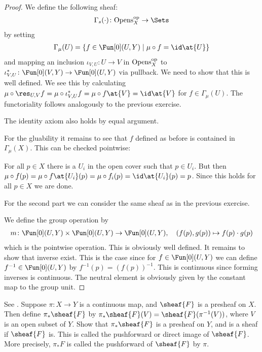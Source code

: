 \begin{proof}
  We define the following sheaf:
  \begin{align*}
    \Gamma_s(\cdot) \colon \Opens_X^\op \rightarrow \Sets
  \end{align*}
  by setting
  \begin{align*}
    \Gamma_\mu(U)= \{f\in \Fun[0](U,Y)\mid \mu\circ f = \id\at{U}\}
  \end{align*}
  and mapping an inclusion $\iota_{V,U} \colon U \rightarrow V$ in $\mathrm{Opens}_X^{\mathrm{op}}$ to
  $\iota^*_{V,U} \colon \Fun[0](V,Y) \rightarrow \Fun[0](U,Y)$ via
  pullback.
  We need to show that this is well defined. We see this by
  calculating $\mu \circ \res_{U,V}f = \mu \circ \iota_{V,U}^* f = \mu \circ f \at{V} = \id
  \at{V}$ for $f\in \Gamma_\mu (U)$.
  The functoriality follows analogously to the previous exercise.

  The identity axiom also holds by equal argument.

  For the gluability it remains to see that $f$ defined as before is
  contained in $\Gamma_\mu(X)$. This can be checked pointwise:

  For all $p\in X$ there is a $U_i$ in the open cover such that $p\in
  U_i$. But then $\mu \circ f (p)= \mu \circ f \at{U_i} (p) = \mu
  \circ f_i (p)= \id\at{U_i}(p) = p$. Since this holds for all $p\in
  X$ we are done.

  \vspace{\baselineskip}

  For the second part we can consider the same sheaf as in the
  previous exercise.

  We define the group operation by
  \begin{align*}
    m\colon \Fun[0](U,Y)\times \Fun[0](U,Y) \rightarrow \Fun[0](U,Y)
    ,\quad (f(p),g(p))\mapsto f(p)\cdot g(p)
  \end{align*}
  which is the pointwise operation. This is obviously well defined. It
  remains to show that inverse exist. This is the case since for $f\in
  \Fun[0](U,Y)$ we can define $f^{-1}\in \Fun[0](U,Y)$ by $f^{-1}(p)=
  (f(p))^{-1}$. This is continuous since forming inverses is
  continuous. The neutral element is obviously given by the constant
  map to the group unit.
\end{proof}

\begin{exercise}[2.2.H]
  See \cite[2.2.H]{vakil2024the-rising-sea}.
  Suppose $\pi \colon X \rightarrow Y$ is a continuous map, and
  $\sheaf{F}$ is a presheaf on $X$. Then define $\pi_*\sheaf{F}$ by
  $\pi_*\sheaf{F} (V) =\sheaf{F}(\pi^{-1}(V))$, where $V$ is an open
  subset of $Y$. Show that $\pi_*\sheaf{F}$ is a presheaf on $Y$, and
  is a sheaf if $\sheaf{F}$ is. This is called the pushforward or
  direct image of $\sheaf{F}$. More precisely, $\pi_*F$ is called the pushforward of $\sheaf{F}$ by $\pi$.
\end{exercise}

